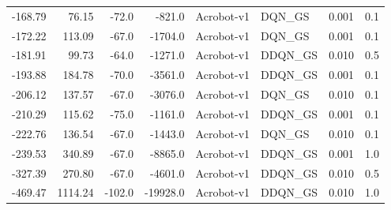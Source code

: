 \begin{tabular}{rrrrllrr}
 -168.79 &    76.15 &  -72.0 &   -821.0 &      Acrobot-v1 &   DQN\_GS &          0.001 &           0.1 \\
 -172.22 &   113.09 &  -67.0 &  -1704.0 &      Acrobot-v1 &   DQN\_GS &          0.001 &           0.1 \\
 -181.91 &    99.73 &  -64.0 &  -1271.0 &      Acrobot-v1 &  DDQN\_GS &          0.010 &           0.5 \\
 -193.88 &   184.78 &  -70.0 &  -3561.0 &      Acrobot-v1 &  DDQN\_GS &          0.001 &           0.1 \\
 -206.12 &   137.57 &  -67.0 &  -3076.0 &      Acrobot-v1 &   DQN\_GS &          0.010 &           0.1 \\
 -210.29 &   115.62 &  -75.0 &  -1161.0 &      Acrobot-v1 &  DDQN\_GS &          0.001 &           0.1 \\
 -222.76 &   136.54 &  -67.0 &  -1443.0 &      Acrobot-v1 &   DQN\_GS &          0.010 &           0.1 \\
 -239.53 &   340.89 &  -67.0 &  -8865.0 &      Acrobot-v1 &  DDQN\_GS &          0.001 &           1.0 \\
 -327.39 &   270.80 &  -67.0 &  -4601.0 &      Acrobot-v1 &  DDQN\_GS &          0.010 &           0.5 \\
 -469.47 &  1114.24 & -102.0 & -19928.0 &      Acrobot-v1 &  DDQN\_GS &          0.010 &           1.0 \\
\bottomrule
\end{tabular}
